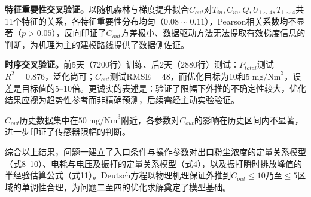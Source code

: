 \textbf{特征重要性交叉验证。}以随机森林\cite{pedregosa2011}与梯度提升拟合$C_{out}$对$T_{in},C_{in},Q,U_{1\sim4},T_{1\sim4}$共11个特征的关系，各特征重要性分布均匀（$0.08\sim0.11$），Pearson相关系数均不显著（$p>0.05$），反向印证了$C_{out}$方差极小、数据驱动方法无法提取有效梯度信息的判断，为机理为主的建模路线提供了数据侧佐证。

\textbf{时序交叉验证。}前5天（7200行）训练、后2天（2880行）测试：$P_{total}$测试$R^2=0.876$，泛化尚可；$C_{out}$测试RMSE$=48$，而优化目标为10和$5\;\text{mg/Nm}^3$，误差是目标值的5--10倍。更诚实的表述是：验证了限幅下外推的不确定性较大，优化结果应视为趋势性参考而非精确预测，后续需经主动实验验证。

$C_{out}$历史数据集中在$50\;\text{mg/Nm}^3$附近，各参数对$C_{out}$的影响在历史区间内不显著，进一步印证了传感器限幅的判断。

综合以上结果，问题一建立了入口条件与操作参数对出口粉尘浓度的定量关系模型（式8--10）、电耗与电压及振打的定量关系模型（式4），以及振打瞬时排放峰值的半经验估算公式（式11）。Deutsch方程以物理机理保证外推到$C_{out}\leq10$乃至$\leq5$区域的单调性合理，为问题二至四的优化求解奠定了模型基础。
